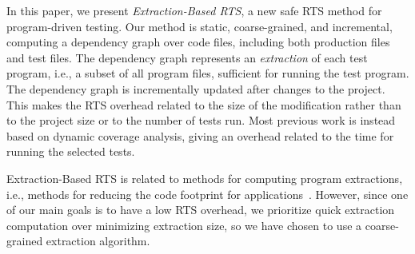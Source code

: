 {In this paper, we present \emph{Extraction-Based RTS}, a new safe RTS method for program-driven testing. Our method is static, coarse-grained, and incremental, computing a dependency graph over code files, including both production files and test files. The dependency graph represents an \emph{extraction} of each test program, i.e., a subset of all program files, sufficient for running the test program. The dependency graph is incrementally updated after changes to the project. This makes the RTS overhead related to the size of the modification rather than to the project size or to the number of tests run. Most previous work is instead based on dynamic coverage analysis, giving an overhead related to the time for running the selected tests.

Extraction-Based RTS is related to methods for computing program extractions, i.e., methods for
reducing the code footprint for applications~\cite{agesen1994sifting,tip2002practical}. However,
since one of our main goals is to have a low RTS overhead, we prioritize quick extraction
computation over minimizing extraction size, so we have chosen to use a coarse-grained extraction
algorithm.



}
